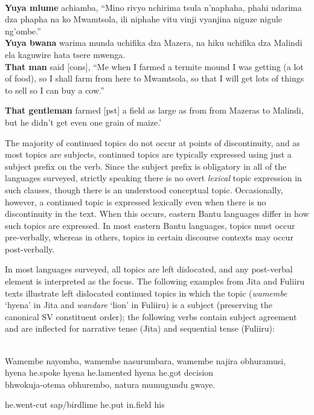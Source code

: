\documentclass[output=paper]{langsci/langscibook}
\begin{document}
\ea\label{ex:}
\\
\gll \textbf{Yuy}\textbf{a mlume} achiamba, “Mino rivyo nchirima tsula n’naphaha, phahi ndarima dza phapha na ko Mwamtsola, ili niphahe vitu vinji vyanjina niguze nigule ng'ombe.”\\
\gll   \textbf{Yuya bwana} warima munda uchifika dza Mazera, na hiku uchifika dza Malindi ela kaguwire hata tsere mwenga.\\
\glt \textbf{\textup{That man}}\textbf{\textup{ }}\textup{said}\textup{ [}\textup{cons}\textup{], “Me when I farmed a termite mound I was getting (a lot of food), so I shall farm from here to Mwamtsola, so that I will get lots of things to sell so I can buy a cow.”}
\z

\glt \textbf{\textup{That gentleman}}\textup{ }\textup{farmed}\textup{ [}\textup{pst}\textup{] a field as large as from from Mazeras to Malindi, but he didn’t get even one grain of maize.’}
\z

The majority of continued topics do not occur at points of discontinuity, and as most topics are subjects, continued topics are typically expressed using just a subject prefix on the verb. Since the subject prefix is obligatory in all of the languages surveyed, strictly speaking there is no overt \textit{lexical} topic expression in such clauses, though there is an understood conceptual topic. Occasionally, however, a continued topic is expressed lexically even when there is no discontinuity in the text. When this occurs, eastern Bantu languages differ in how such topics are expressed. In most eastern Bantu languages, topics must occur pre-verbally, whereas in others, topics in certain discourse contexts may occur post-verbally.

In most languages surveyed, all topics are left dislocated, and any post-verbal element is interpreted as the focus. The following examples from Jita and Fuliiru texts illustrate left dislocated continued topics in which the topic (\textit{wamembe} ‘hyena’ in Jita and \textit{wandare} ‘lion’ in Fuliiru) is a subject (preserving the canonical SV constituent order); the following verbs contain subject agreement and are inflected for narrative tense (Jita) and sequential tense (Fuliiru):

\ea\label{ex:}
\\
\gll Wamembe nayomba, wamembe nasurumbara, wamembe najira obhuramusi,\\
     hyena he.spoke hyena he.lamented hyena he.got decision\\
\gll bhwokuja-otema obhurembo, natura mumugundu gwaye.\\
\begin{styleUntitledi}
he.went-cut sap/birdlime he.put in.field his
\end{styleUntitledi}
\end{document}
